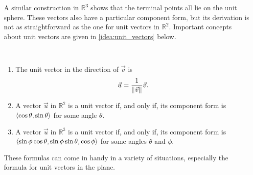 A similar construction in $\mathbb{R}^3$ shows that the terminal points all lie on the unit sphere. These vectors also have a particular component form, but its derivation is not as straightforward as the one for unit vectors in $\mathbb{R}^2$. Important concepts about unit vectors are given in \autoref{idea:unit_vectors} below.

\begin{keyidea}\label{idea:unit_vectors}%
%
\mbox{}\\[-2\baselineskip]\parbox[t]{\linewidth}{\begin{enumerate}
	\item	The unit vector in the direction of $\vec v$ is
	\[\vec u = \frac1{\left\lVert \vec v \right\rVert} \vec v.\]
	\item	A vector $\vec u$ in $\mathbb{R}^2$ is a unit vector if, and only if, its component form is $\left\langle \cos\theta,\sin\theta\right\rangle$ for some angle $\theta$.
	\item	A vector $\vec u$ in $\mathbb{R}^3$ is a unit vector if, and only if, its component form is $\left\langle \sin\phi\cos\theta,\sin\phi\sin\theta,\cos\phi\right\rangle$ for some angles $\theta$ and $\phi$.
\end{enumerate}}
\end{keyidea}

These formulas can come in handy in a variety of situations, especially the formula for unit vectors in the plane.


